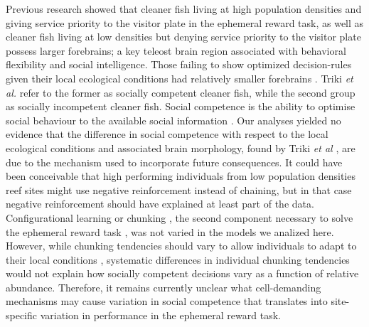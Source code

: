 \documentclass[]{rsos}%
\begin{document}
Previous research showed that cleaner fish living at high population
densities and giving service priority to the visitor plate in the
ephemeral reward task, as well as cleaner fish living at low
densities but denying service priority to the visitor plate possess
larger forebrains; a key teleost brain region associated with
behavioral flexibility and social intelligence. Those failing to
show optimized decision-rules given their local ecological
conditions had relatively smaller forebrains \citep{triki_Brain_2020}.
Triki \emph{et al.} refer to the former as socially competent cleaner fish,
while the second group as socially incompetent cleaner fish.
Social competence is the ability to optimise social behaviour
to the available social information \citep{taborsky_Social_2012a, bshary_Cooperation_2015, varela_Correlated_2020}. Our analyses yielded no
evidence that the difference in social competence with respect to the local
ecological conditions and associated brain morphology,
found by Triki \emph{et al} \citep{triki_Brain_2020}, are due to the mechanism
used to incorporate future consequences. It could have been conceivable that
high performing individuals from low population densities reef sites
might use negative reinforcement instead of chaining, but in that
case negative reinforcement should have explained at least
part of the data. Configurational learning or
chunking \citep{sutherland_Configural_1989, miller_Magical_1956},
the second component necessary to solve the ephemeral
reward task \citep{quinones_Reinforcement_2019}, was
not varied in the models we analized here. However, while chunking tendencies
should vary to allow individuals to adapt to their local conditions
\citep{prat_Modelling_2022, kolodny_Evolution_2014}, systematic differences
in individual chunking tendencies would not explain how socially
competent decisions vary as a function of relative abundance.
Therefore, it remains currently unclear what cell-demanding
mechanisms may cause variation in social competence that
translates into site-specific variation in performance in the
ephemeral reward task.
\end{document}
